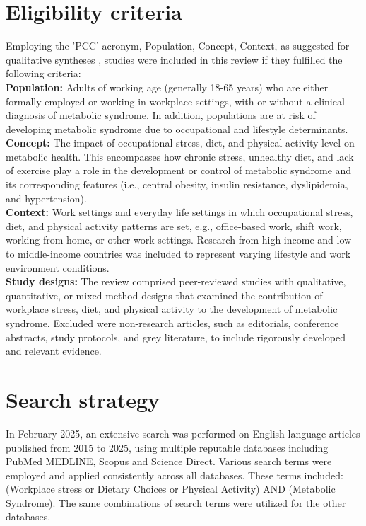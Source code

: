 \section{ Eligibility criteria}
Employing the 'PCC' acronym, Population, Concept, Context, as suggested for qualitative syntheses \cite{lockwood2017}, studies were included in this review if they fulfilled the following criteria:\\
\textbf{Population:} Adults of working age (generally 18-65 years) who are either formally employed or working in workplace settings, with or without a clinical diagnosis of metabolic syndrome. In addition, populations are at risk of developing metabolic syndrome due to occupational and lifestyle determinants. \\
\textbf{Concept:} The impact of occupational stress, diet, and physical activity level on metabolic health. This encompasses how chronic stress, unhealthy diet, and lack of exercise play a role in the development or control of metabolic syndrome and its corresponding features (i.e., central obesity, insulin resistance, dyslipidemia, and hypertension). \\
\textbf{Context:} Work settings and everyday life settings in which occupational stress, diet, and physical activity patterns are set, e.g., office-based work, shift work, working from home, or other work settings. Research from high-income and low- to middle-income countries was included to represent varying lifestyle and work environment conditions. \\
\textbf{Study designs:} The review comprised peer-reviewed studies with qualitative, quantitative, or mixed-method designs that examined the contribution of workplace stress, diet, and physical activity to the development of metabolic syndrome. Excluded were non-research articles, such as editorials, conference abstracts, study protocols, and grey literature, to include rigorously developed and relevant evidence.

\section{ Search strategy}
In February 2025, an extensive search was performed on English-language articles published from 2015 to 2025, using multiple reputable databases including PubMed MEDLINE, Scopus and Science Direct. Various search terms were employed and applied consistently across all databases. These terms included: (Workplace stress or Dietary Choices or Physical Activity) AND (Metabolic Syndrome). The same combinations of search terms were utilized for the other databases. 

